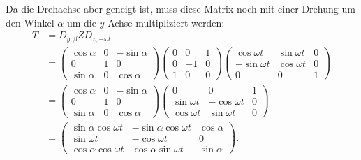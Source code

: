 \begin{loesung}
Da die Drehachse aber geneigt ist, muss diese Matrix noch mit einer
Drehung um den Winkel $\alpha$ um die $y$-Achse multipliziert werden:
\begin{align*}
T&=
D_{y,\beta}ZD_{z,-\omega t}\\
&=
\begin{pmatrix}
\cos\alpha&0&-\sin\alpha\\
     0    &1&     0     \\
\sin\alpha&0& \cos\alpha
\end{pmatrix}
\begin{pmatrix}
0& 0&1\\
0&-1&0\\
1& 0&0
\end{pmatrix}
\begin{pmatrix}
 \cos\omega t & \sin\omega t & 0\\
-\sin\omega t & \cos\omega t & 0\\
     0       &     0        & 1
\end{pmatrix}
\\
&=
\begin{pmatrix}
\cos\alpha&0&-\sin\alpha\\
     0    &1&     0     \\
\sin\alpha&0& \cos\alpha
\end{pmatrix}
\begin{pmatrix}
     0        &      0       & 1\\
 \sin\omega t &-\cos\omega t & 0\\
 \cos\omega t & \sin\omega t & 0
\end{pmatrix}
\\
&=
\begin{pmatrix}
\sin\alpha\cos\omega t & -\sin\alpha\cos\omega t &\cos\alpha\\
\sin\omega t           & -\cos\omega t           & 0\\
\cos\alpha\cos\omega t &  \cos\alpha\sin\omega t &\sin\alpha
\end{pmatrix}.
\end{align*}
\end{loesung}
